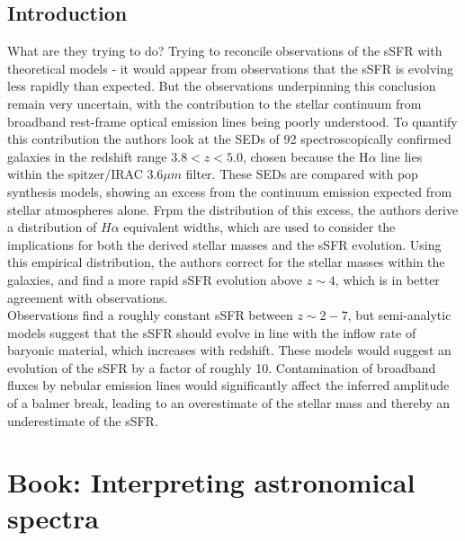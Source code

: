 \documentclass{literature}
\begin{document}
\subsection{Introduction}
What are they trying to do? Trying to reconcile observations of the sSFR with theoretical models - it would appear from observations that the sSFR is evolving less rapidly than expected. But the observations underpinning this conclusion remain very uncertain, with the contribution to the stellar continuum from broadband rest-frame optical emission lines being poorly understood. To quantify this contribution the authors look at the SEDs of 92 spectroscopically confirmed galaxies in the redshift range $3.8 < z < 5.0$, chosen because the H$\alpha$ line lies within the spitzer/IRAC 3.6$\mu m$ filter. These SEDs are compared with pop synthesis models, showing an excess from the continuum emission expected from stellar atmospheres alone. Frpm the distribution of this excess, the authors derive a distribution of $H\alpha$ equivalent widths, which are used to consider the implications for both the derived stellar masses and the sSFR evolution. Using this empirical distribution, the authors correct for the stellar masses within the galaxies, and find a more rapid sSFR evolution above $z \sim 4$, which is in better agreement with observations. \\ 
Observations find a roughly constant sSFR between $z \sim 2 - 7$, but semi-analytic models suggest that the sSFR should evolve in line with the inflow rate of baryonic material, which increases with redshift. These models would suggest an evolution of the sSFR by a factor of roughly 10.  
Contamination of broadband fluxes by nebular emission lines would significantly affect the inferred amplitude of a balmer break, leading to an overestimate of the stellar mass and thereby an underestimate of the sSFR. 

\section{Book: Interpreting astronomical spectra}\label{Interpreting astronomical spectra}




\review
\label{background-review}
\end{document}
